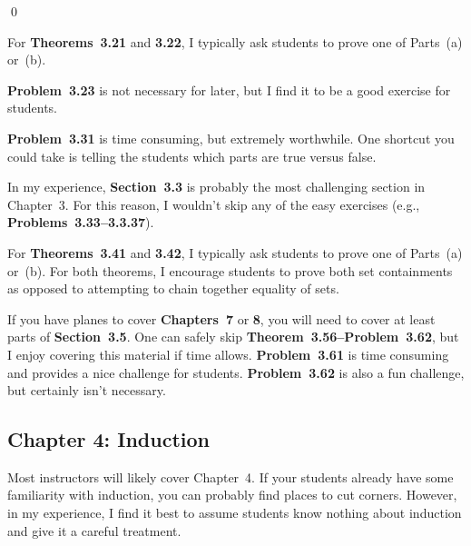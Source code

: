 \documentclass[11pt]{article}%
\newcommand{\blankline}{\pagebreak[2]\vspace{.5\baselineskip}}
\begin{document}
\qed

\blankline

For \textbf{Theorems~3.21} and \textbf{3.22}, I typically ask students to prove one of Parts~(a) or~(b).

\blankline

\textbf{Problem~3.23} is not necessary for later, but I find it to be a good exercise for students.

\blankline

\textbf{Problem~3.31} is time consuming, but extremely worthwhile.  One shortcut you could take is telling the students which parts are true versus false.

\blankline

In my experience, \textbf{Section~3.3} is probably the most challenging section in Chapter~3.  For this reason, I wouldn't skip any of the easy exercises (e.g., \textbf{Problems~3.33--3.3.37}).  

\blankline

For \textbf{Theorems~3.41} and \textbf{3.42}, I typically ask students to prove one of Parts~(a) or~(b).  For both theorems, I encourage students to prove both set containments as opposed to attempting to chain together equality of sets.

\blankline

If you have planes to cover \textbf{Chapters~7} or \textbf{8}, you will need to cover at least parts of \textbf{Section~3.5}.  One can safely skip \textbf{Theorem~3.56--Problem~3.62}, but I enjoy covering this material if time allows. \textbf{Problem~3.61} is time consuming and provides a nice challenge for students.  \textbf{Problem~3.62} is also a fun challenge, but certainly isn't necessary.

\subsection*{Chapter 4: Induction}

Most instructors will likely cover Chapter~4.  If your students already have some familiarity with induction, you can probably find places to cut corners.  However, in my experience, I find it best to assume students know nothing about induction and give it a careful treatment.  

\blankline
\end{document}
